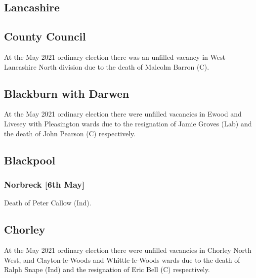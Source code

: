 \documentclass[a4paper,openany]{book}
\begin{document}
\begin{resultsiii}
\section{Lancashire}

\subsection*{County Council}

At the May 2021 ordinary election there was an unfilled vacancy in West Lancashire North division due to the death of Malcolm Barron (C).

\subsection*{Blackburn with Darwen}

At the May 2021 ordinary election there were unfilled vacancies in Ewood and Livesey with Pleasington wards due to the resignation of Jamie Groves (Lab) and the death of John Pearson (C) respectively.%
%

\subsection*{Blackpool}

\subsubsection*{Norbreck \hspace*{\fill}\nolinebreak[1]%
	\enspace\hspace*{\fill}
	[6th May]}


Death of Peter Callow (Ind).

\subsection*{Chorley}

At the May 2021 ordinary election there were unfilled vacancies in Chorley North West, and Clayton-le-Woods and Whittle-le-Woods wards due to the death of Ralph Snape (Ind) and the resignation of Eric Bell (C) respectively.


\end{resultsiii}
\end{document}
